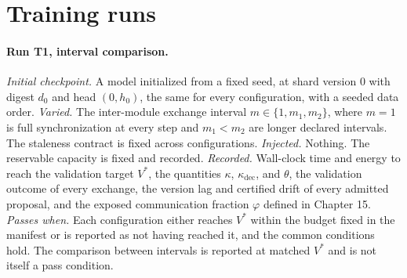 \documentclass[11pt,openany]{book}
\theoremstyle{remark}
\begin{document}
\section{Training runs}

\paragraph{Run T1, interval comparison.} \emph{Initial checkpoint.} A model initialized from a fixed seed, at shard version $0$ with digest $d_0$ and head $(0,h_0)$, the same for every configuration, with a seeded data order. \emph{Varied.} The inter-module exchange interval $m\in\{1,m_1,m_2\}$, where $m=1$ is full synchronization at every step and $m_1<m_2$ are longer declared intervals. The staleness contract is fixed across configurations. \emph{Injected.} Nothing. The reservable capacity is fixed and recorded. \emph{Recorded.} Wall-clock time and energy to reach the validation target $V^{*}$, the quantities $\kappa$, $\kappa_{\mathrm{dec}}$, and $\theta$, the validation outcome of every exchange, the version lag and certified drift of every admitted proposal, and the exposed communication fraction $\varphi$ defined in Chapter 15. \emph{Passes when.} Each configuration either reaches $V^{*}$ within the budget fixed in the manifest or is reported as not having reached it, and the common conditions hold. The comparison between intervals is reported at matched $V^{*}$ and is not itself a pass condition.
\end{document}
